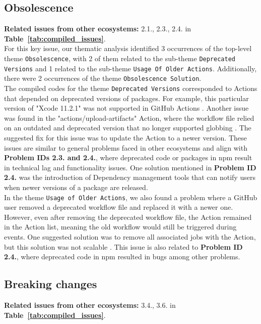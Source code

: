\documentclass[conference]{IEEEtran}
\begin{document}
\subsection*{\textbf{Obsolescence}}
\textbf{Related issues from other ecosystems:} 2.1., 2.3., 2.4. in \textbf{Table~\ref{tab:compiled_issues}}.\\

	For this key issue, our thematic analysis identified 3 occurrences of the top-level theme \texttt{Obsolescence}, with 2 of them related to the sub-theme \texttt{Deprecated Versions} and 1 related to the sub-theme \texttt{Usage Of Older Actions}. Additionally, there were 2 occurrences of the theme \texttt{Obsolescence Solution}.\\
The compiled codes for the theme \texttt{Deprecated Versions} corresponded to Actions that depended on deprecated versions of packages. For example, this particular version of "Xcode 11.2.1" was not supported in GitHub Actions \cite{sinoru2024}. Another issue was found in the "actions/upload-artifacts" Action, where the workflow file relied on an outdated and deprecated version that no longer supported globbing \cite{graysuit2024}. The suggested fix for this issue was to update the Action to a newer version. These issues are similar to general problems faced in other ecosystems and align with \textbf{Problem IDs 2.3. and 2.4.}, where deprecated code or packages in npm result in technical lag and functionality issues. One solution mentioned in \textbf{Problem ID 2.4.} was the introduction of Dependency management tools that can notify users when newer versions of a package are released.\\
In the theme \texttt{Usage of Older Actions}, we also found a problem where a GitHub user removed a deprecated workflow file and replaced it with a newer one. However, even after removing the deprecated workflow file, the Action remained in the Action list, meaning the old workflow would still be triggered during events. One suggested solution was to remove all associated jobs with the Action, but this solution was not scalable \cite{ryanvanderpol2024}. This issue is also related to \textbf{Problem ID 2.4.}, where deprecated code in npm resulted in bugs among other problems.
\subsection*{\textbf{Breaking changes}}
\textbf{Related issues from other ecosystems:} 3.4., 3.6. in \textbf{Table~\ref{tab:compiled_issues}}.\\
\end{document}
